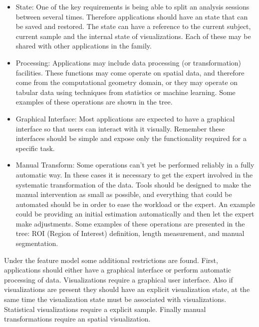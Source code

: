 \begin{itemize}
\begin{itemize}
\begin{itemize}
\end{itemize}
\end{itemize}
\item State: One of the key requirements is being able to split an analysis sessions between several times. Therefore applications should have an state that can be saved and restored. The state can have a reference to the current subject, current sample and the internal state of visualizations. Each of these may be shared with other applications in the family. 
\item Processing: Applications may include data processing (or transformation) facilities. These functions may come operate on spatial data, and therefore come from the computational geometry domain, or they may operate on tabular data using techniques from statistics or machine learning. Some examples of these operations are shown in the tree.
\item Graphical Interface: Most applications are expected to have a graphical interface so that users can interact with it visually. Remember these interfaces should be simple and expose only the functionality required for a specific task.
\item  Manual Transform: Some operations can't yet be performed reliably in a fully automatic way. In these cases it is necessary to get the expert involved in the systematic transformation of the data. Tools should be designed to make the manual intervention as small as possible, and everything that could be automated should be in order to ease the workload or the expert. An example could be providing an initial estimation automatically and then let the expert make adjustments. Some examples of these operations are presented in the tree: ROI (Region of Interest) definition, length measurement, and manual segmentation.
\end{itemize}

Under the feature model some additional restrictions are found. First, applications should either have a graphical interface or perform automatic processing of data. Visualizations require a graphical user interface. Also if visualizations are present they should have an explicit visualization state, at the same time the visualization state must be associated with visualizations. Statistical visualizations require a explicit sample. Finally manual transformations require an spatial visualization. 

